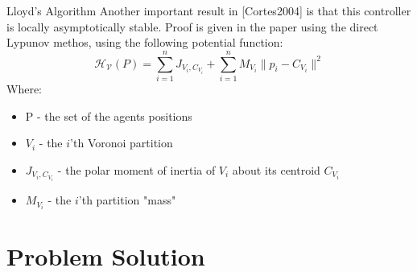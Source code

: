 \documentclass[t]{beamer}
\newcommand{\norm}[1]{\lVert #1 \rVert}
\begin{document}
\begin{frame}[label=lloydsalg7]{Lloyd's Algorithm}
Another important result in [Cortes2004] is that this controller is locally asymptotically stable. Proof is given in the paper using the direct Lypunov methos, using the following potential function:
\begin{equation*}
\mathcal{H_{V}}\left( P \right) = \sum_{i=1}^{n} J_{V_i,C_{V_i}} + \sum_{i=1}^{n} M_{V_i} \norm{p_i - C_{V_i}}^2
\end{equation*}
Where:
\begin{itemize}
\item P - the set of the agents positions
\item $V_i$ - the $i$'th Voronoi partition
\item $J_{V_i,C_{V_i}}$ - the polar moment of inertia of $V_i$ about its centroid $C_{V_i}$
\item $M_{V_i}$ - the $i$'th partition "mass"
\end{itemize}
\end{frame}


\section[Problem Solution]{Problem Solution}
\end{document}
